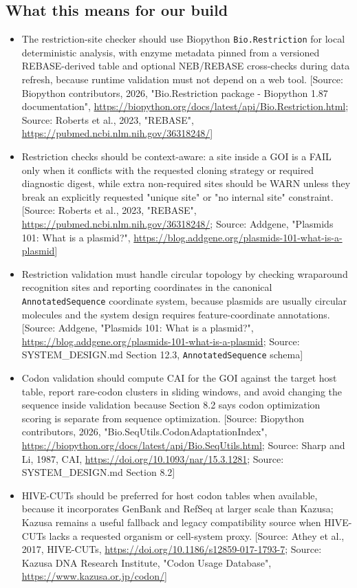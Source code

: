 \documentclass[11pt]{report}
\begin{document}
\subsection{What this means for our build}
\begin{itemize}
\item The restriction-site checker should use Biopython \texttt{Bio.Restriction} for local deterministic analysis, with enzyme metadata pinned from a versioned REBASE-derived table and optional NEB/REBASE cross-checks during data refresh, because runtime validation must not depend on a web tool. [Source: Biopython contributors, 2026, "Bio.Restriction package - Biopython 1.87 documentation", \url{https://biopython.org/docs/latest/api/Bio.Restriction.html}; Source: Roberts et al., 2023, "REBASE", \url{https://pubmed.ncbi.nlm.nih.gov/36318248/}]
\item Restriction checks should be context-aware: a site inside a GOI is a FAIL only when it conflicts with the requested cloning strategy or required diagnostic digest, while extra non-required sites should be WARN unless they break an explicitly requested "unique site" or "no internal site" constraint. [Source: Roberts et al., 2023, "REBASE", \url{https://pubmed.ncbi.nlm.nih.gov/36318248/}; Source: Addgene, "Plasmids 101: What is a plasmid?", \url{https://blog.addgene.org/plasmids-101-what-is-a-plasmid}]
\item Restriction validation must handle circular topology by checking wraparound recognition sites and reporting coordinates in the canonical \texttt{AnnotatedSequence} coordinate system, because plasmids are usually circular molecules and the system design requires feature-coordinate annotations. [Source: Addgene, "Plasmids 101: What is a plasmid?", \url{https://blog.addgene.org/plasmids-101-what-is-a-plasmid}; Source: SYSTEM\_DESIGN.md Section 12.3, \texttt{AnnotatedSequence} schema]
\item Codon validation should compute CAI for the GOI against the target host table, report rare-codon clusters in sliding windows, and avoid changing the sequence inside validation because Section 8.2 says codon optimization scoring is separate from sequence optimization. [Source: Biopython contributors, 2026, "Bio.SeqUtils.CodonAdaptationIndex", \url{https://biopython.org/docs/latest/api/Bio.SeqUtils.html}; Source: Sharp and Li, 1987, CAI, \url{https://doi.org/10.1093/nar/15.3.1281}; Source: SYSTEM\_DESIGN.md Section 8.2]
\item HIVE-CUTs should be preferred for host codon tables when available, because it incorporates GenBank and RefSeq at larger scale than Kazusa; Kazusa remains a useful fallback and legacy compatibility source when HIVE-CUTs lacks a requested organism or cell-system proxy. [Source: Athey et al., 2017, HIVE-CUTs, \url{https://doi.org/10.1186/s12859-017-1793-7}; Source: Kazusa DNA Research Institute, "Codon Usage Database", \url{https://www.kazusa.or.jp/codon/}]

\end{itemize}
\end{document}
